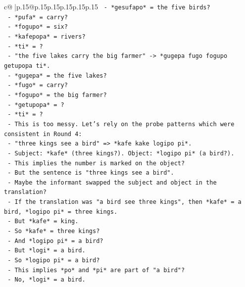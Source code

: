 \documentclass{article}
\begin{document}
{\begin{supertabular}{c@{$\;$}|p{.15\linewidth}@{}p{.15\linewidth}p{.15\linewidth}p{.15\linewidth}p{.15\linewidth}p{.15\linewidth}}
{{{\texttt{              {-} *gesufapo* = the five birds?} \\
\texttt{              {-} *pufa* = carry?} \\
\texttt{              {-} *fogupo* = six?} \\
\texttt{              {-} *kafepopa* = rivers?} \\
\texttt{              {-} *ti* = ?} \\
\texttt{            {-} "the five lakes carry the big farmer" {-}> *gugepa fugo fogupo getupopa ti*.} \\
\texttt{              {-} *gugepa* = the five lakes?} \\
\texttt{              {-} *fugo* = carry?} \\
\texttt{              {-} *fogupo* = the big farmer?} \\
\texttt{              {-} *getupopa* = ?} \\
\texttt{              {-} *ti* = ?} \\
\texttt{            {-} This is too messy. Let's rely on the probe patterns which were consistent in Round 4:} \\
\texttt{              {-} "three kings see a bird" => *kafe kake logipo pi*.} \\
\texttt{                {-} Subject: *kafe* (three kings?). Object: *logipo pi* (a bird?).} \\
\texttt{                {-} This implies the number is marked on the object?} \\
\texttt{                {-} But the sentence is "three kings see a bird".} \\
\texttt{                {-} Maybe the informant swapped the subject and object in the translation?} \\
\texttt{                {-} If the translation was "a bird see three kings", then *kafe* = a bird, *logipo pi* = three kings.} \\
\texttt{                {-} But *kafe* = king.} \\
\texttt{                {-} So *kafe* = three kings?} \\
\texttt{                {-} And *logipo pi* = a bird?} \\
\texttt{                {-} But *logi* = a bird.} \\
\texttt{                {-} So *logipo pi* = a bird?} \\
\texttt{                {-} This implies *po* and *pi* are part of "a bird"?} \\
\texttt{                {-} No, *logi* = a bird.} \\
}}}
\end{supertabular}}
\end{document}
